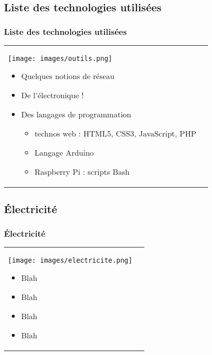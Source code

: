\documentclass[handout]{beamer}
\begin{document}
	\subsection{Liste des technologies utilisées}
		\begin{frame}
		\frametitle{Liste des technologies utilisées}

		\begin{tabular}{l l}
			\begin{minipage}{0.2\textwidth}
				\begin{center}
					\texttt{[image: images/outils.png]}
				\end{center}
			\end{minipage}

			\begin{minipage}{0.8\textwidth}
				\begin{itemize}
					\item Quelques notions de réseau
					\item De l'électronique !
					\item Des langages de programmation
					\begin{itemize}
						\item technos web : HTML5, CSS3, JavaScript, PHP
						\item Langage Arduino
						\item Raspberry Pi : scripts Bash
					\end{itemize}
				\end{itemize}
			\end{minipage}
			
		\end{tabular}
		\end{frame}

	\subsection{Électricité}
		\begin{frame}
		\frametitle{Électricité}

		\begin{tabular}{l l}
			\begin{minipage}{0.2\textwidth}
				\begin{center}
					\texttt{[image: images/electricite.png]}
				\end{center}
			\end{minipage}

			\begin{minipage}{0.8\textwidth}
				\begin{itemize}
					\item Blah
					\item Blah
					\item Blah
					\item Blah
				\end{itemize}
			\end{minipage}
			
		\end{tabular}
		\end{frame}
\end{document}
